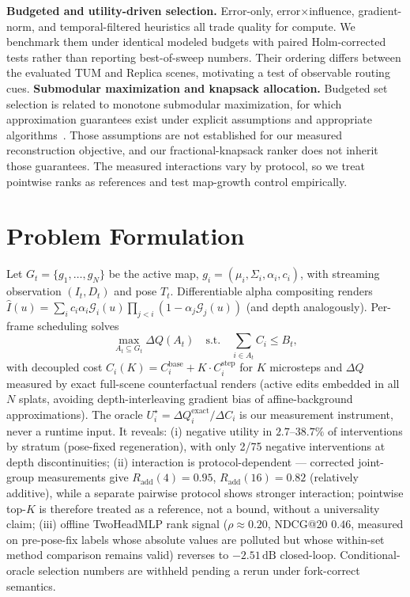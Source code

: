 \documentclass[10pt,twocolumn,letterpaper]{article}
\begin{document}
\textbf{Budgeted and utility-driven selection.}
Error-only, error$\times$influence, gradient-norm, and temporal-filtered heuristics all trade quality for compute.
We benchmark them under identical modeled budgets with paired Holm-corrected tests rather than reporting best-of-sweep numbers. Their ordering differs between the evaluated TUM and Replica scenes, motivating a test of observable routing cues.
\textbf{Submodular maximization and knapsack allocation.}
Budgeted set selection is related to monotone submodular maximization, for which approximation guarantees exist under explicit assumptions and appropriate algorithms~\cite{nemhauser1978analysis,sviridenko2004knapsack}. Those assumptions are not established for our measured reconstruction objective, and our fractional-knapsack ranker does not inherit those guarantees. The measured interactions vary by protocol, so we treat pointwise ranks as references and test map-growth control empirically.

\section{Problem Formulation}
Let $G_t = \{g_1, \dots, g_N\}$ be the active map, $g_i = (\mu_i, \Sigma_i, \alpha_i, c_i)$, with streaming observation $(I_t, D_t)$ and pose $T_t$.
Differentiable alpha compositing renders
$\hat{I}(u) = \sum_i c_i \alpha_i \mathcal{G}_i(u) \prod_{j<i}(1-\alpha_j \mathcal{G}_j(u))$
(and depth analogously).
Per-frame scheduling solves
\begin{equation}
\max_{A_t \subseteq G_t} \Delta Q(A_t) \quad \text{s.t.} \quad \sum_{i \in A_t} C_i \le B_t,
\end{equation}
with decoupled cost $C_i(K) = C_i^{\mathrm{base}} + K \cdot C_i^{\mathrm{step}}$ for $K$ microsteps and $\Delta Q$ measured by exact full-scene counterfactual renders (active edits embedded in all $N$ splats, avoiding depth-interleaving gradient bias of affine-background approximations).
The oracle $U_i^\star = \Delta Q_i^{\mathrm{exact}} / \Delta C_i$ is our measurement instrument, never a runtime input.
It reveals: (i) negative utility in $2.7$--$38.7\%$ of interventions by stratum (pose-fixed regeneration), with only 2/75 negative interventions at depth discontinuities; (ii) interaction is protocol-dependent --- corrected joint-group measurements give $R_{\mathrm{add}}(4) = 0.95$, $R_{\mathrm{add}}(16) = 0.82$ (relatively additive), while a separate pairwise protocol shows stronger interaction; pointwise top-$K$ is therefore treated as a reference, not a bound, without a universality claim; (iii) offline TwoHeadMLP rank signal ($\rho \approx 0.20$, NDCG@20 $0.46$, measured on pre-pose-fix labels whose absolute values are polluted but whose within-set method comparison remains valid) reverses to $-2.51\,\mathrm{dB}$ closed-loop. Conditional-oracle selection numbers are withheld pending a rerun under fork-correct semantics.
\end{document}
